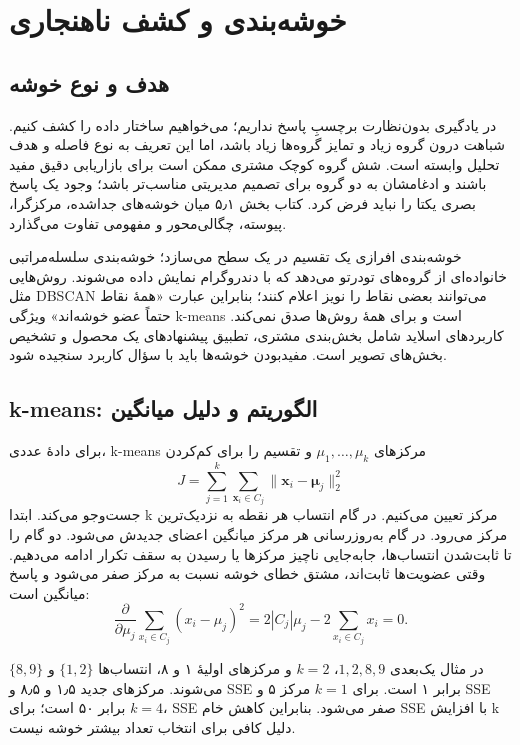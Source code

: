 \chapter{خوشه‌بندی و کشف ناهنجاری}
\section{هدف و نوع خوشه}

در یادگیری بدون‌نظارت برچسبِ پاسخ نداریم؛ می‌خواهیم ساختار داده را کشف کنیم. شباهت درون گروه زیاد و تمایز گروه‌ها زیاد باشد، اما این تعریف به نوع فاصله و هدف تحلیل وابسته است. شش گروه کوچک مشتری ممکن است برای بازاریابی دقیق مفید باشند و ادغامشان به دو گروه برای تصمیم مدیریتی مناسب‌تر باشد؛ وجود یک پاسخ بصری یکتا را نباید فرض کرد. کتاب بخش ۵٫۱ میان خوشه‌های جداشده، مرکزگرا، پیوسته، چگالی‌محور و مفهومی تفاوت می‌گذارد.

خوشه‌بندی افرازی یک تقسیم در یک سطح می‌سازد؛ خوشه‌بندی سلسله‌مراتبی خانواده‌ای از گروه‌های تودرتو می‌دهد که با دندروگرام نمایش داده می‌شوند. روش‌هایی مثل DBSCAN می‌توانند بعضی نقاط را نویز اعلام کنند؛ بنابراین عبارت «همهٔ نقاط حتماً عضو خوشه‌اند» ویژگی k-means است و برای همهٔ روش‌ها صدق نمی‌کند. کاربردهای اسلاید شامل بخش‌بندی مشتری، تطبیق پیشنهادهای یک محصول و تشخیص بخش‌های تصویر است. مفیدبودن خوشه‌ها باید با سؤال کاربرد سنجیده شود.

\section{k-means: الگوریتم و دلیل میانگین}

برای دادهٔ عددی، k-means مرکزهای \(\mu_1,\ldots,\mu_k\) و تقسیم را برای کم‌کردن \[
J=\sum_{j=1}^k\sum_{\boldsymbol x_i\in C_j}\|\boldsymbol x_i-\boldsymbol\mu_j\|_2^2
\] جست‌وجو می‌کند. ابتدا k مرکز تعیین می‌کنیم. در گام انتساب هر نقطه به نزدیک‌ترین مرکز می‌رود. در گام به‌روزرسانی هر مرکز میانگین اعضای جدیدش می‌شود. دو گام را تا ثابت‌شدن انتساب‌ها، جابه‌جایی ناچیز مرکزها یا رسیدن به سقف تکرار ادامه می‌دهیم. وقتی عضویت‌ها ثابت‌اند، مشتق خطای خوشه نسبت به مرکز صفر می‌شود و پاسخ میانگین است: \[
\frac{\partial}{\partial\mu_j}\sum_{x_i\in C_j}(x_i-\mu_j)^2=2|C_j|\mu_j-2\sum_{x_i\in C_j}x_i=0.
\]

در مثال یک‌بعدی \(1,2,8,9\)، $k=2$ و مرکزهای اولیهٔ ۱ و ۸، انتساب‌ها \(\{1,2\}\) و \(\{8,9\}\) می‌شوند. مرکزهای جدید ۱٫۵ و ۸٫۵ و SSE برابر ۱ است. برای $k=1$ مرکز ۵ و SSE برابر ۵۰ است؛ برای $k=4$، SSE صفر می‌شود. بنابراین کاهش خام SSE با افزایش k دلیل کافی برای انتخاب تعداد بیشتر خوشه نیست.

